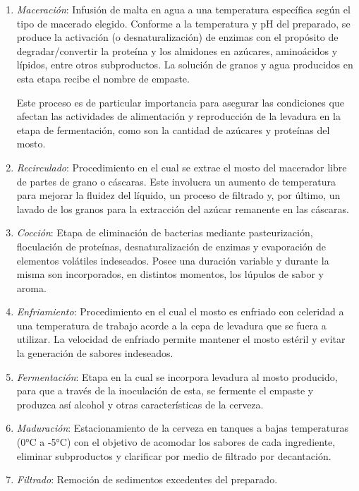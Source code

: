         \begin{enumerate}
            \item \textit{Maceración}: Infusión de malta en agua a una temperatura específica según el tipo de macerado elegido. Conforme a la temperatura y pH del preparado, se produce la activación (o desnaturalización) de enzimas con el propósito de degradar/convertir la proteína y los almidones en azúcares, aminoácidos y lípidos, entre otros subproductos. La solución de granos y agua producidos en esta etapa recibe el nombre de empaste.
            
            \par Este proceso es de particular importancia para asegurar las condiciones que afectan las actividades de alimentación y reproducción de la levadura en la etapa de fermentación, como son la cantidad de azúcares y proteínas del mosto.
            
            \item \textit{Recirculado}: Procedimiento en el cual se extrae el mosto del macerador libre de partes de grano o cáscaras. Este involucra un aumento de temperatura para mejorar la fluidez del líquido, un proceso de filtrado y, por último, un lavado de los granos para la extracción del azúcar remanente en las cáscaras.
            
            \item \textit{Cocción}: Etapa de eliminación de bacterias mediante pasteurización, floculación de proteínas, desnaturalización de enzimas y evaporación de elementos volátiles indeseados. Posee una duración variable y durante la misma son incorporados, en distintos momentos, los lúpulos de sabor y aroma.

            \item \textit{Enfriamiento}: Procedimiento en el cual el mosto es enfriado con celeridad a una temperatura de trabajo acorde a la cepa de levadura que se fuera a utilizar. La velocidad de enfriado permite mantener el mosto estéril y evitar la generación de sabores indeseados.

            \item \textit{Fermentación}: Etapa en la cual se incorpora levadura al mosto producido, para que a través de la inoculación de esta, se fermente el empaste y produzca así alcohol y otras características de la cerveza. 

            \item \textit{Maduración}: Estacionamiento de la cerveza en tanques a bajas temperaturas (0°C a -5°C) con el objetivo de acomodar los sabores de cada ingrediente, eliminar subproductos y clarificar por medio de filtrado por decantación.

            \item \textit{Filtrado}: Remoción de sedimentos excedentes del preparado. 
        \end{enumerate}
        
